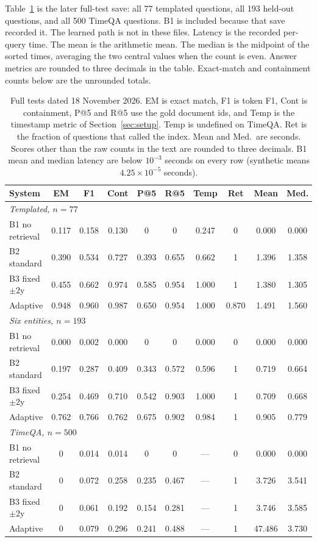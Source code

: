 \documentclass[11pt,letterpaper]{article}
\begin{document}
Table~\ref{tab:fulltest} is the later full-test save: all 77 templated questions, all 193 held-out questions, and all 500 TimeQA questions.
B1 is included because that save recorded it.
The learned path is not in these files.
Latency is the recorded per-query time.
The mean is the arithmetic mean.
The median is the midpoint of the sorted times, averaging the two central values when the count is even.
Answer metrics are rounded to three decimals in the table.
Exact-match and containment counts below are the unrounded totals.

\begin{table}[t]
\centering
\caption{Full tests dated 18 November 2026.
EM is exact match, F1 is token F1, Cont is containment, P@5 and R@5 use the gold document ids, and Temp is the timestamp metric of Section~\ref{sec:setup}.
Temp is undefined on TimeQA.
Ret is the fraction of questions that called the index.
Mean and Med.\ are seconds.
Scores other than the raw counts in the text are rounded to three decimals.
B1 mean and median latency are below $10^{-3}$ seconds on every row (synthetic means $4.25\times 10^{-5}$ seconds).}
\label{tab:fulltest}
\footnotesize
\setlength{\tabcolsep}{3.2pt}
\begin{tabular}{lccccccccc}
\toprule
System & EM & F1 & Cont & P@5 & R@5 & Temp & Ret & Mean & Med. \\
\midrule
\multicolumn{10}{l}{\emph{Templated, $n{=}77$}} \\
B1 no retrieval & 0.117 & 0.158 & 0.130 & 0 & 0 & 0.247 & 0 & 0.000 & 0.000 \\
B2 standard & 0.390 & 0.534 & 0.727 & 0.393 & 0.655 & 0.662 & 1 & 1.396 & 1.358 \\
B3 fixed $\pm 2$y & 0.455 & 0.662 & 0.974 & 0.585 & 0.954 & 1.000 & 1 & 1.380 & 1.305 \\
Adaptive & 0.948 & 0.960 & 0.987 & 0.650 & 0.954 & 1.000 & 0.870 & 1.491 & 1.560 \\
\midrule
\multicolumn{10}{l}{\emph{Six entities, $n{=}193$}} \\
B1 no retrieval & 0.000 & 0.002 & 0.000 & 0 & 0 & 0.000 & 0 & 0.000 & 0.000 \\
B2 standard & 0.197 & 0.287 & 0.409 & 0.343 & 0.572 & 0.596 & 1 & 0.719 & 0.664 \\
B3 fixed $\pm 2$y & 0.254 & 0.469 & 0.710 & 0.542 & 0.903 & 1.000 & 1 & 0.709 & 0.668 \\
Adaptive & 0.762 & 0.766 & 0.762 & 0.675 & 0.902 & 0.984 & 1 & 0.905 & 0.779 \\
\midrule
\multicolumn{10}{l}{\emph{TimeQA, $n{=}500$}} \\
B1 no retrieval & 0 & 0.014 & 0.014 & 0 & 0 & --- & 0 & 0.000 & 0.000 \\
B2 standard & 0 & 0.072 & 0.258 & 0.235 & 0.467 & --- & 1 & 3.726 & 3.541 \\
B3 fixed $\pm 2$y & 0 & 0.061 & 0.192 & 0.154 & 0.281 & --- & 1 & 3.746 & 3.585 \\
Adaptive & 0 & 0.079 & 0.296 & 0.241 & 0.488 & --- & 1 & 47.486 & 3.730 \\
\bottomrule
\end{tabular}
\end{table}
\end{document}
